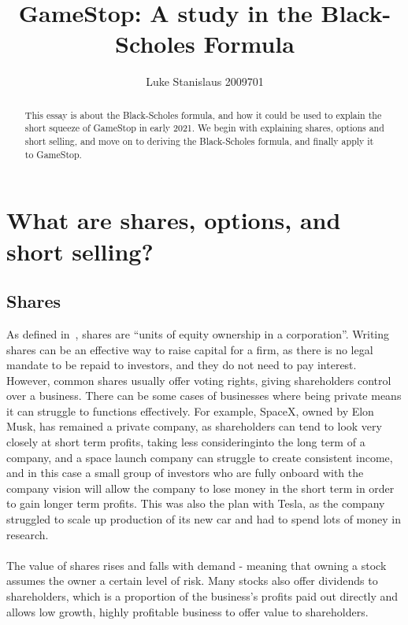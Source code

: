 \documentclass[11pt]{article} %
\title{GameStop: A study in the Black-Scholes Formula}
\author{Luke Stanislaus 2009701}
\begin{document}
\maketitle
\tableofcontents
\begin{abstract}
    This essay is about the Black-Scholes formula, and how it could be 
    used to explain the short squeeze of GameStop in early 2021. We begin 
    with explaining shares, options and short selling, and move on to 
    deriving the Black-Scholes formula, and finally apply it to GameStop.
    \end{abstract}



\section{What are shares, options, and short selling?}
\subsection{Shares}
As defined in~\cite{shares}, shares are ``units of equity 
ownership in a corporation''. Writing shares can be an effective way to raise 
capital for a firm, as there is no legal mandate to be repaid to 
investors, and they do not need to pay interest. However, common shares usually offer voting 
rights, giving shareholders control over a business. There can be some cases 
of businesses where being private means it can struggle to functions effectively.
For example, SpaceX, owned by Elon Musk, has remained a private company, as 
shareholders can tend to look very closely at short term profits, taking less 
consideringinto the long term of a company, and a space launch company can 
struggle to create consistent income, and in this case a small group of investors 
who are fully onboard with the company vision will allow the company to lose 
money in the short term in order to gain longer term profits. This was also 
the plan with Tesla, as the company struggled to scale up production of its new 
car and had to spend lots of money in research. 
\paragraph{}
The value of 
shares rises and falls with demand - meaning that owning a stock assumes 
the owner a certain level of risk. Many stocks also offer dividends to 
shareholders, which is a proportion of the business's profits paid out 
directly and allows low growth, highly profitable business to offer value 
to shareholders.
\end{document}

